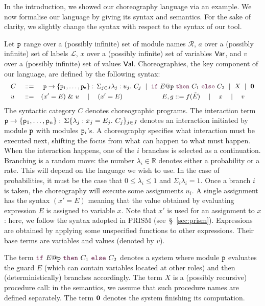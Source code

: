 In the introduction, we showed our choreography language via an
example. We now formalise our language by giving its syntax and
semantics. For the sake of clarity, we slightly change the syntax with
respect to the syntax of our tool.

%
Let $\mathtt{p}$ range over a (possibly infinite) set of module names
$\mathcal R$, $a$ over a (possibly infinite) set of labels
$\mathcal L$, $x$ over a (possibly infinite) set of variables
$\mathsf{Var}$, and $v$ over a (possibly infinite) set of values
$\mathsf{Val}$.
%
Choreographies, the key component of our language, are defined by the
following syntax:
%
\begin{displaymath}\small
  \begin{array}{llllllllllll}
    C \ & ::= & \
      \interact{p}{\role p_1,\ldots,\role p_n}
      \ \mid\
      \ifTE {E}{p}{C_1}{C_2}
      \ \mid\ X \ \mid\  \CEnd
    \\[1mm]
    u     & ::=  & (x' = E)\ \&\ u \quad\mid\quad    (x' = E)
    \qquad\qquad\qquad
    E, g     ::=        f(\tilde E)\quad\mid\quad x\quad\mid\quad v

  \end{array}
\end{displaymath}
The syntactic category $C$ denotes choreographic programs. The
interaction term
$\mathtt{p}\rightarrow \{\mathtt{p}_1,\ldots,\mathtt{p}_n\}:\,\Sigma\{\lambda_j: x_j=E_j.\ C_j\}_{j\in J}$ denotes an
interaction initiated by module $\mathtt{p}$ with modules $\mathtt{p}_i$'s. A choreography specifies what interaction must be executed
next, shifting the focus from what can happen to what must
happen. When the interaction happens, one of the $i$ branches is
selected as a continuation. Branching is a random move: the number
$\lambda_i\in\mathbb R$ denotes either a probability or a rate. This
will depend on the language we wish to use. In the case of
probabilities, it must be the case that $0\leq\lambda_i\leq 1$ and
$\Sigma_i\lambda_i=1$. Once a branch $i$ is taken, the choreography
will execute some assignments $u_i$. A single assignment has the
syntax $(x' = E)$ meaning that the value obtained by evaluating
expression $E$ is assigned to variable $x$. Note that $x'$ is used for
an assignment to $x$: here, we follow the syntax adopted in PRISM
(see~\S~\ref{sec:prism}). Expressions are obtained by applying some
unspecified functions to other expressions. Their base terms are
variables and values (denoted by $v$).
%

The term $\ifTE {E}{p}{C_1}{C_2}$ denotes a system where module
  $\mathtt{p}$ evaluates the guard $E$ (which can contain variables
  located at other roles) and then (deterministically) branches
  accordingly.  The term $X$ is a (possibly recursive) procedure call:
  in the semantics, we assume that such procedure names are defined
  separately.  The term $\mathbf{0}$ denotes the system finishing its
  computation.

